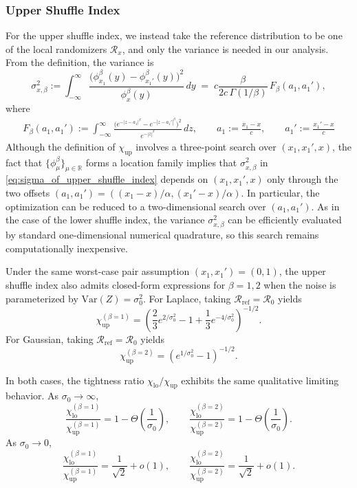 \documentclass{article}
\theoremstyle{plain}
\theoremstyle{definition}
\begin{document}
\subsubsection{Upper Shuffle Index}
For the upper shuffle index, we instead take the reference distribution to be one of the local randomizers $\mathcal R_x$, and only the variance is needed in our analysis.
From the definition, the variance is
\begin{equation}
  \label{eq:sigma_of_upper_shuffle_index}
  \sigma_{x,\beta}^2
  :=
  \int_{-\infty}^{\infty}
    \frac{\bigl(\phi_{x_1}^{\beta}(y)-\phi_{x_1'}^{\beta}(y)\bigr)^2}
         {\phi_x^{\beta}(y)}\,dy
  \;=\;
  c \frac{\beta}{2c\,\Gamma(1/\beta)}\,
  F_\beta(a_1,a_1'),
\end{equation}
where
\begin{align}
  \nonumber F_\beta(a_1,a_1')
  :=
    \int_{-\infty}^{\infty}
    \frac{\bigl(e^{-|z-a_1|^\beta}-e^{-|z-a_1'|^\beta}\bigr)^2}
         {e^{-|z|^\beta}}\,dz,
  \qquad
         a_1 := \frac{x_1 - x}{c},
  \qquad
  a_1' := \frac{x_1' - x}{c}
\end{align}
Although the definition of $\chi_{\mathrm{up}}$ involves a
three-point search over $(x_1,x_1',x)$, the fact that
$\{\phi_\mu^\beta\}_{\mu\in\mathbb R}$ forms a location family implies
that $\sigma_{x,\beta}^2$ in
\eqref{eq:sigma_of_upper_shuffle_index} depends on $(x_1,x_1',x)$ only
through the two offsets $(a_1,a_1') = ((x_1-x)/\alpha,(x_1'-x)/\alpha)$.
In particular, the optimization can be reduced to a two-dimensional
search over $(a_1,a_1')$. As in the case of the lower shuffle index,
the variance $\sigma_{x,\beta}^2$ can be efficiently evaluated
by standard one-dimensional numerical quadrature, so this search remains computationally inexpensive.


Under the same worst-case pair assumption $(x_1,x_1')=(0,1)$, the upper shuffle index also admits closed-form expressions for $\beta=1,2$ when the noise is parameterized by $\mathrm{Var}(Z)=\sigma_0^2$. 
For Laplace, taking $\mathcal{R}_\mathrm{ref}=\mathcal{R}_0$ yields
\[
\chi_{\mathrm{up}}^{(\beta=1)}
=
\left(\frac{2}{3}e^{2/\sigma_0^2}-1+\frac{1}{3}e^{-4/\sigma_0^2}\right)^{-1/2}.
\]
For Gaussian, taking $\mathcal{R}_\mathrm{ref}=\mathcal{R}_0$ yields
\[
\chi_{\mathrm{up}}^{(\beta=2)}
=
\left(e^{1/\sigma_0^2}-1\right)^{-1/2}.
\]


In both cases, the tightness ratio $\chi_{\mathrm{lo}}/\chi_{\mathrm{up}}$ exhibits the same qualitative limiting behavior. As $\sigma_0\to\infty$,
\[
\frac{\chi_{\mathrm{lo}}^{(\beta=1)}}{\chi_{\mathrm{up}}^{(\beta=1)}}
=
1-\Theta\!\left(\frac{1}{\sigma_0}\right),
\qquad
\frac{\chi_{\mathrm{lo}}^{(\beta=2)}}{\chi_{\mathrm{up}}^{(\beta=2)}}
=
1-\Theta\!\left(\frac{1}{\sigma_0}\right).
\]
As $\sigma_0\to 0$,
\[
\frac{\chi_{\mathrm{lo}}^{(\beta=1)}}{\chi_{\mathrm{up}}^{(\beta=1)}}
=
\frac{1}{\sqrt2}+o(1),
\qquad
\frac{\chi_{\mathrm{lo}}^{(\beta=2)}}{\chi_{\mathrm{up}}^{(\beta=2)}}
=
\frac{1}{\sqrt2}+o(1).
\]
\end{document}
